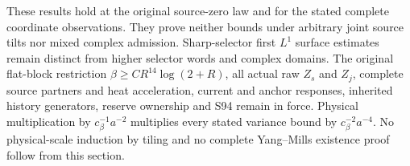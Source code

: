 These results hold at the original source-zero law and for the stated complete
coordinate observations. They prove neither bounds under arbitrary joint
source tilts nor mixed complex admission. Sharp-selector first \(L^1\)
surface estimates remain distinct from higher selector words and complex
domains. The original flat-block restriction
\(\beta\ge CR^{14}\log(2+R)\), all actual raw \(Z_s\) and \(Z_j\),
complete source partners and heat acceleration, current and anchor responses,
inherited history generators, reserve ownership and S94 remain in force.
Physical multiplication by \(c_\beta^{-1}a^{-2}\) multiplies every stated
variance bound by \(c_\beta^{-2}a^{-4}\). No physical-scale induction by
tiling and no complete Yang--Mills existence proof follow from this section.
